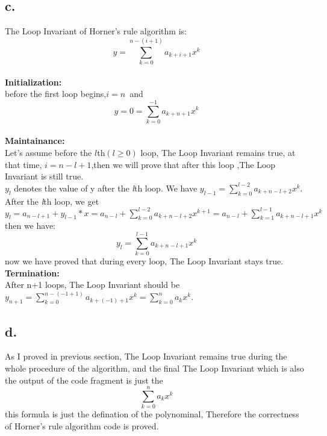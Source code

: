 \documentclass[oneside]{homework} %
\begin{document}
\subsection*{c.} The Loop Invariant of Horner's rule algorithm is:$$y=\sum_{k=0}^{n-(i+1)}a_{k+i+1}x^k$$\\
\textbf{Initialization:}\\before the first loop begins,$i=n$~and~$$y=0=\sum_{k=0}^{-1}a_{k+n+1}x^k$$\\
\textbf{Maintainance:}\\Let's assume before the $l$th$(l\geq0)$ loop, The Loop Invariant remains true, at that time, $i=n-l+1$,then we will prove that after this loop ,The Loop Invariant is still true.\\
$y_{l}$ denotes the value of y after the \emph{l}th loop. We have $y_{l-1}=\sum_{k=0}^{l-2}a_{k+n-l+2}x^k$.\\
After the \emph{l}th loop, we get $y_{l} = a_{n-l+1} + y_{l-1}*x = a_{n-l}+\sum_{k=0}^{l-2}a_{k+n-l+2}x^{k+1}=a_{n-l}+\sum_{k=1}^{l-1}a_{k+n-l+1}x^{k}$ then we have:$$y_{l}=\sum_{k=0}^{l-1}a_{k+n-l+1}x^k$$ now we have proved that during every loop, The Loop Invariant stays true.\\
\textbf{Termination:}\\After n+1 loops, The Loop Invariant should be $y_{n+1} = \sum_{k=0}^{n-(-1+1)}a_{k+(-1)+1}x^{k} = \sum_{k=0}^{n}a_{k}x^{k}$.

\subsection*{d.} 
As I proved in previous section, The Loop Invariant remains true during the whole procedure of the algorithm, and the final The Loop Invariant which is also the output of the code fragment is just the $$\sum_{k=0}^{n}a_{k}x^{k}$$ this formula is just the defination of the polynominal, Therefore the correctness of Horner's rule algorithm code is proved.
\end{document}
